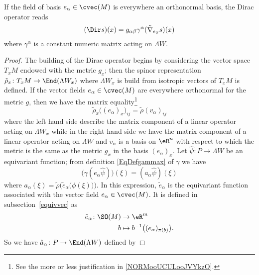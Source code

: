 \begin{proposition}		\label{PROPooUCECooOmdvmn}
	If the field of basis $e_{\alpha}\in\cvec(M)$ is everywhere an orthonormal basis, the Dirac operator reads
	\begin{equation}
		(\Dir s)(x)=g_{\alpha\beta}\gamma^{\alpha}(\tilde\nabla_{e_{\beta}}s)(x)
	\end{equation}
	where $\gamma^{\alpha}$ is a constant numeric matrix acting on $\Lambda W$.
\end{proposition}

\begin{proof}
	The building of the Dirac operator begins by considering the vector space $T_xM$ endowed with the metric $g_x$; then the spinor representation $\tilde\rho_x\colon T_xM\to \End(\Lambda W_x)$ where $\Lambda W_x$ is build from isotropic vectors of $T_xM$ is defined. If the vector fields $e_{\alpha}\in\cvec(M)$ are everywhere orthonormal for the metric $g$, then we have the matrix equality\footnote{See the more or less justification in \ref{NORMooUCULooJVYkzO}.}
	\begin{equation}		\label{EQooQMKEooWwVyus}
		\tilde\rho_x\big( (e_{\alpha})_x \big)_{ij}=\tilde\rho(v_{\alpha})_{ij}
	\end{equation}
	where the left hand side describe the matrix component of a linear operator acting on $\Lambda W_x$ while in the right hand side we have the matrix component of a linear operator acting on $\Lambda W$ and $v_{\alpha}$ is a basis on $\eR^n$ with respect to which the metric is the same as the metric $g_x$ in the basis $(e_{\alpha})_x$. Let $\hat{\psi}\colon P\to \Lambda W$ be an equivariant function; from definition \eqref{EqDefgammax} of $\gamma$ we have
	\[
		\big( \gamma(e_{\alpha}\hat{\psi}) \big)(\xi)=(a_{\alpha}\hat{\psi})(\xi)
	\]
	where $a_{\alpha}(\xi)=\tilde\rho\Big( \tilde{e}_{\alpha}\big( \phi(\xi) \big) \Big)$. In this expression, $\tilde{e}_{\alpha}$ is the equivariant function associated with the vector field $e_{\alpha}\in\cvec(M)$. It is defined in subsection~\ref{equivvec} as
	\begin{equation}
		\begin{aligned}
			\tilde{e}_{\alpha}\colon \SO(M) & \to \eR^m                                        \\
			b                               & \mapsto b^{-1}\big( (e_{\alpha})_{\pi(b)} \big).
		\end{aligned}
	\end{equation}
	So we have $\hat a_{\alpha}\colon P\to \End(\Lambda W)$ defined by

\end{proof}

